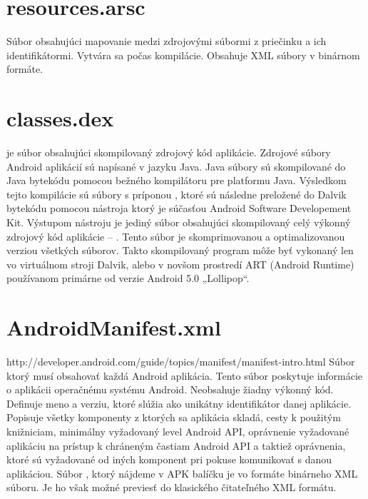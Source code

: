 \section{resources.arsc}
\label{resources.arsc}
Súbor obsahujúci mapovanie medzi zdrojovými súbormi  z priečinku  a ich identifikátormi.  Vytvára sa počas kompilácie. Obsahuje XML súbory v binárnom formáte.

\section{classes.dex}
\label{classes.dex}
 je súbor obsahujúci skompilovaný zdrojový kód aplikácie.  Zdrojové súbory Android aplikácií sú napísané v jazyku Java. Java súbory sú skompilované do Java bytekódu pomocou bežného kompilátoru pre platformu Java. Výsledkom tejto kompilácie sú súbory s príponou , ktoré sú následne preložené do Dalvik bytekódu pomocou nástroja  ktorý je súčasťou Android Software Developement Kit. Výstupom nástroju  je jediný súbor obsahujúci skompilovaný celý výkonný zdrojový kód aplikácie -- . Tento súbor je skomprimovanou a optimalizovanou verziou všetkých  súborov. Takto skompilovaný program môže byť vykonaný len vo virtuálnom stroji Dalvik, alebo v novšom prostredí ART (Android Runtime) používanom primárne od verzie Android 5.0 „Lollipop“.

\section{AndroidManifest.xml} 
\label{AndroidManifest.xml}
http://developer.android.com/guide/topics/manifest/manifest-intro.html
Súbor ktorý musí obsahovať každá Android aplikácia. Tento súbor poskytuje informácie o aplikácii operačnému systému Android. Neobsahuje žiadny výkonný kód. Definuje meno a verziu, ktoré slúžia ako unikátny identifikátor danej aplikácie. Popisuje všetky komponenty z ktorých sa aplikácia skladá, cesty k použitým knižniciam, minimálny vyžadovaný level Android API, oprávnenie vyžadované aplikáciu na prístup k chráneným častiam Android API a taktiež oprávnenia, ktoré sú vyžadované od iných komponent pri pokuse komunikovať s danou aplikáciou. Súbor , ktorý nájdeme v APK balíčku je vo formáte binárneho XML súboru. Je ho však možné previesť do klasického čitateľného XML formátu.

